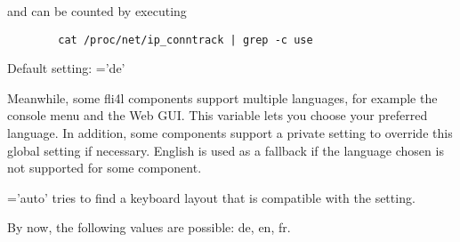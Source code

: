 \begin{description}
    and can be counted by executing

\begin{example}
\begin{verbatim}
        cat /proc/net/ip_conntrack | grep -c use
\end{verbatim}
\end{example}


  Default setting: ='de'

  Meanwhile, some fli4l components support multiple languages, for example
  the console menu and the Web GUI. This variable lets you choose your
  preferred language. In addition, some components support a private setting
  to override this global setting if necessary. English is used as a fallback
  if the language chosen is not supported for some component.

  ='auto' tries to find a keyboard layout that is
  compatible with the  setting.

  By now, the following values are possible: de, en, fr.

\end{description}
